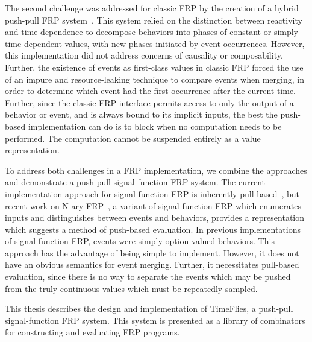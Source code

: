 The second challenge was addressed for classic FRP by the creation of a hybrid
push-pull FRP system~\cite{Elliott2009}. This system relied on the distinction
between reactivity and time dependence to decompose behaviors into phases of
constant or simply time-dependent values, with new phases initiated by event
occurrences. However, this implementation did not address concerns of causality
or composability. Further, the existence of events as first-class values in
classic FRP forced the use of an impure and resource-leaking technique to
compare events when merging, in order to determine which event had the first
occurrence after the current time. Further, since the classic FRP interface
permits access to only the output of a behavior or event, and is always bound to
its implicit inputs, the best the push-based implementation can do is to block
when no computation needs to be performed. The computation cannot be suspended
entirely as a value representation.

To address both challenges in a FRP implementation, we combine the approaches
and demonstrate a push-pull signal-function FRP system. The current
implementation approach for signal-function FRP is inherently
pull-based~\cite{Nilsson2002}, but recent work on N-ary
FRP~\cite{Sculthorpe2011}, a variant of signal-function FRP which enumerates
inputs and distinguishes between events and behaviors, provides a representation
which suggests a method of push-based evaluation. In previous implementations of
signal-function FRP, events were simply option-valued behaviors. This approach has
the advantage of being simple to implement. However, it does not have an obvious
semantics for event merging. Further, it necessitates pull-based evaluation,
since there is no way to separate the events which may be pushed from the truly
continuous values which must be repeatedly sampled.

This thesis describes the design and implementation of TimeFlies, a push-pull signal-function FRP system. This system is presented as a library
of combinators for constructing and evaluating FRP programs.
